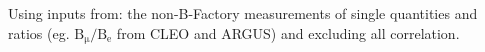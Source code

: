 \noindent Using inputs from: the non-B-Factory measurements of single quantities and ratios (eg. $\mathrm{B_\mu/B_e}$ from CLEO and ARGUS) and excluding all correlation.
